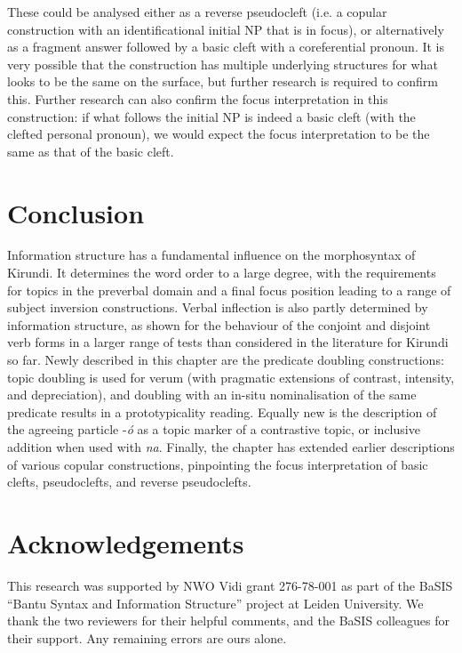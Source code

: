\documentclass[output=paper]{langscibook}
\begin{document}

\z

These could be analysed either as a reverse pseudocleft (i.e. a copular construction with an identificational initial NP that is in focus), or alternatively as a fragment answer followed by a basic cleft with a coreferential pronoun. It is very possible that the construction has multiple underlying structures for what looks to be the same on the surface, but further research is required to confirm this. Further research can also confirm the focus interpretation in this construction: if what follows the initial NP is indeed a basic cleft (with the clefted personal pronoun), we would expect the focus interpretation to be the same as that of the basic cleft. 

\section{Conclusion}

Information structure has a fundamental influence on the morphosyntax of Kirundi. It determines the word order to a large degree, with the requirements for topics in the preverbal domain and a final focus position leading to a range of subject inversion constructions. Verbal inflection is also partly determined by information structure, as shown for the behaviour of the conjoint and disjoint verb forms in a larger range of tests than considered in the literature for Kirundi so far. Newly described in this chapter are the predicate doubling constructions: topic doubling is used for verum (with pragmatic extensions of contrast, intensity, and depreciation), and doubling with an in-situ nominalisation of the same predicate results in a prototypicality reading. Equally new is the description of the agreeing particle -\textit{ó} as a topic marker of a contrastive topic, or inclusive addition when used with \textit{na}. Finally, the chapter has extended earlier descriptions of various copular constructions, pinpointing the focus interpretation of basic clefts, pseudoclefts, and reverse pseudoclefts.

\section*{Acknowledgements}\largerpage

This research was supported by NWO Vidi grant 276-78-001 as part of the BaSIS “Bantu Syntax and Information Structure” project at Leiden University. We thank the two reviewers for their helpful comments, and the BaSIS colleagues for their support. Any remaining errors are ours alone.
\end{document}
